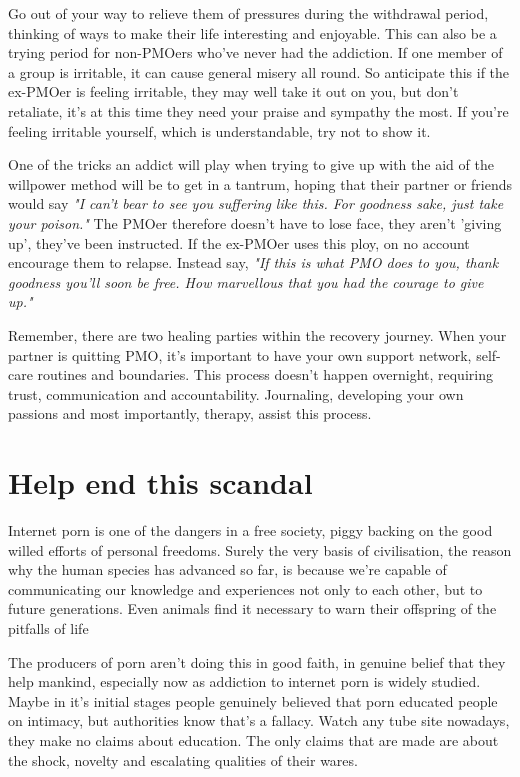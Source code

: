 \documentclass[easypeasy.tex]{subfiles}
\begin{document}
Go out of your way to relieve them of pressures during the withdrawal period, thinking of ways to make their life interesting and enjoyable. This can also be a trying period for non-PMOers who've never had the addiction. If one member of a group is irritable, it can cause general misery all round. So anticipate this if the ex-PMOer is feeling irritable, they may well take it out on you, but don't retaliate, it's at this time they need your praise and sympathy the most. If you're feeling irritable yourself, which is understandable, try not to show it.

One of the tricks an addict will play when trying to give up with the aid of the willpower method will be to get in a tantrum, hoping that their partner or friends would say \textit{"I can't bear to see you suffering like this. For goodness sake, just take your poison."} The PMOer therefore doesn't have to lose face, they aren't 'giving up', they've been instructed. If the ex-PMOer uses this ploy, on no account encourage them to relapse. Instead say, \textit{"If this is what PMO does to you, thank goodness you'll soon be free. How marvellous that you had the courage to give up."}

Remember, there are two healing parties within the recovery journey. When your partner is quitting PMO, it's important to have your own support network, self-care routines and boundaries. This process doesn't happen overnight, requiring trust, communication and accountability. Journaling, developing your own passions and most importantly, therapy, assist this process.

\section{Help end this scandal}

Internet porn is one of the dangers in a free society, piggy backing on the good willed efforts of personal freedoms. Surely the very basis of civilisation, the reason why the human species has advanced so far, is because we're capable of communicating our knowledge and experiences not only to each other, but to future generations. Even animals find it necessary to warn their offspring of the pitfalls of life

The producers of porn aren't doing this in good faith, in genuine belief that they help mankind, especially now as addiction to internet porn is widely studied. Maybe in it's initial stages people genuinely believed that porn educated people on intimacy, but authorities know that's a fallacy. Watch any tube site nowadays, they make no claims about education. The only claims that are made are about the shock, novelty and escalating qualities of their wares.
\end{document}
